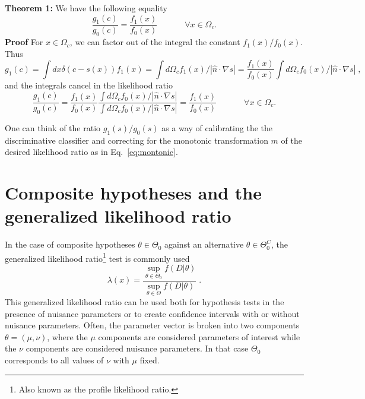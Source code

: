 \documentclass[11pt, oneside]{article}   	%
\begin{document}
\textbf{\flushleft Theorem 1:}
We have the following equality
\begin{equation}
\frac{g_1(c)}{g_0(c)} =  \frac{f_1(x)}{f_0(x)}  \;\hspace{3em} \forall x\in\Omega_c.
\end{equation}
\textbf{Proof}
For $x\in \Omega_c$, we can factor out of the integral the constant $f_1(x)/f_0(x)$.
Thus
\begin{equation}
g_1(c) = \int dx \delta(c-s(x)) f_1(x) = \int d\Omega_c f_1(x) / | \hat{n} \cdot \nabla s  |= \frac{f_1(x)}{f_0(x)} \int d\Omega_c f_0(x)  / | \hat{n} \cdot \nabla s  | \;,
\end{equation}
and the integrals cancel in the likelihood ratio
\begin{equation}
\frac{g_1(c)}{g_0(c)} = \frac{f_1(x)}{f_0(x)} \frac{\int d\Omega_c f_0(x)/ | \hat{n} \cdot \nabla s  |}{ \int d\Omega_c f_0(x) / | \hat{n} \cdot \nabla s  |} = \frac{f_1(x)}{f_0(x)}  \;\hspace{3em} \forall x\in\Omega_c.
\end{equation}

One can think of the ratio $g_1(s)/g_0(s)$ as a way of calibrating the the discriminative classifier and correcting for the monotonic transformation $m$ of the desired likelihood ratio as in Eq.~\ref{eq:montonic}.




\section{Composite hypotheses and the generalized likelihood ratio}\label{S:GLR}

In the case of composite hypotheses $\theta \in \Theta_0$ against an alternative $\theta \in \Theta_0^C$, the generalized likelihood ratio\footnote{Also known as the profile likelihood ratio.} test is commonly used
\begin{equation}
\lambda(x) =  \frac{ \sup_{\theta \in \Theta_0} f(D | \theta)}{ \sup_{\theta \in \Theta} f(D | \theta)} \; .
\end{equation}
This generalized likelihood ratio can be used both for hypothesis tests in the presence of nuisance parameters or to create confidence intervals with or without nuisance parameters.  Often, the parameter vector is broken into two components $\theta=(\mu,\nu)$, where the $\mu$ components are considered parameters of interest while the $\nu$ components are considered nuisance parameters. In that case $\Theta_0$ corresponds to all values of $\nu$ with $\mu$ fixed.
\end{document}
